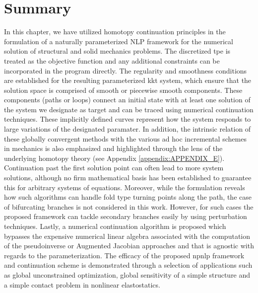 \section{Summary}

In this chapter, we have utilized homotopy continuation principles in the
formulation of a naturally parameterized NLP framework for
the numerical solution of structural and solid mechanics problems. The
discretized \acrshort{tpe} is treated as the objective function and any 
additional
constraints can be incorporated in the program directly. The regularity and
smoothness conditions are established for the resulting parameterized 
\acrshort{kkt}
system, which ensure that the
solution space is comprised of smooth or piecewise smooth components. These
components (paths or loops) connect an initial state with at least one solution 
of the system we designate as target and can be traced using numerical
continuation techniques. These implicitly defined curves
represent how the system responds to large variations of the designated
paramater. In addition, the intrinsic relation of these globally convergent 
methods with the various ad
hoc incremental schemes in mechanics is also emphasized and highlighted 
through the lens of the
underlying homotopy theory (see Appendix \ref{appendix:APPENDIX_E}). Continuation past 
the first 
solution point can 
often lead 
to more system solutions, although no firm mathematical basis has been
established to guarantee this for arbitrary systems of equations. Moreover, 
while the formulation reveals how such algorithms 
can handle fold type turning points along the path, the case of 
bifurcating branches is not considered in this work. However, for such cases the
proposed framework can tackle secondary branches easily by using perturbation
techniques. Lastly, a numerical continuation algorithm is proposed which
bypasses the expensive numerical linear algebra associated with the computation 
of the
pseudoinverse or Augmented Jacobian approaches and that is agnostic with regards
to the parameterization.
The efficacy of the proposed \acrshort{npnlp} framework and continuation scheme 
is
demonstrated through a selection of 
applications such as global unconstrained optimization, global 
sensitivity of a simple structure and a simple contact problem in nonlinear
elastostatics.
